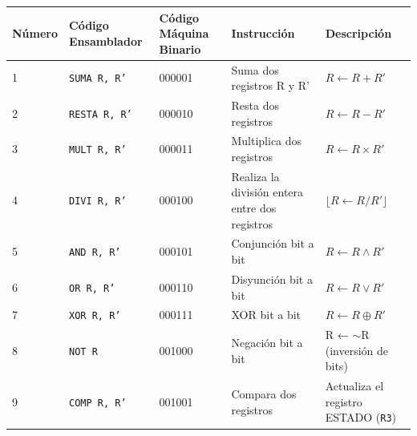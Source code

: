 \documentclass{article}
\begin{document}
\begin{longtable}{|p{}|p{}|p{}|p{}|p{}|}
  \hline
  \textbf{Número} & \textbf{Código Ensamblador} & \textbf{Código Máquina Binario} & \textbf{Instrucción}                                               & \textbf{Descripción}                       \\
  \hline
  1               & \texttt{SUMA R, R'}         & 000001                          & Suma dos registros R y R'                                          & $R \leftarrow  R + R'$                     \\
  \hline
  2               & \texttt{RESTA R, R'}        & 000010                          & Resta dos registros                                                & $R \leftarrow R - R'$                      \\
  \hline
  3               & \texttt{MULT R, R'}         & 000011                          & Multiplica dos registros                                           & $R \leftarrow R \times R'$                 \\
  \hline
  4               & \texttt{DIVI R, R'}         & 000100                          & Realiza la división entera entre dos registros                     & $\lfloor R \leftarrow R / R' \rfloor$      \\
  \hline
  5               & \texttt{AND R, R'}          & 000101                          & Conjunción bit a bit                                               & $R \leftarrow R \wedge R'$                 \\
  \hline
  6               & \texttt{OR R, R'}           & 000110                          & Disyunción bit a bit                                               & $R \leftarrow R \vee R'$                   \\
  \hline
  7               & \texttt{XOR R, R'}          & 000111                          & XOR bit a bit                                                      & $R \leftarrow R \oplus R'$                 \\
  \hline
  8               & \texttt{NOT R}              & 001000                          & Negación bit a bit                                                 & R ← $\sim$R (inversión de bits)            \\
  \hline
  9               & \texttt{COMP R, R'}         & 001001                          & Compara dos registros                                              & Actualiza el registro ESTADO (\texttt{R3}) \\

\end{longtable}
\end{document}

